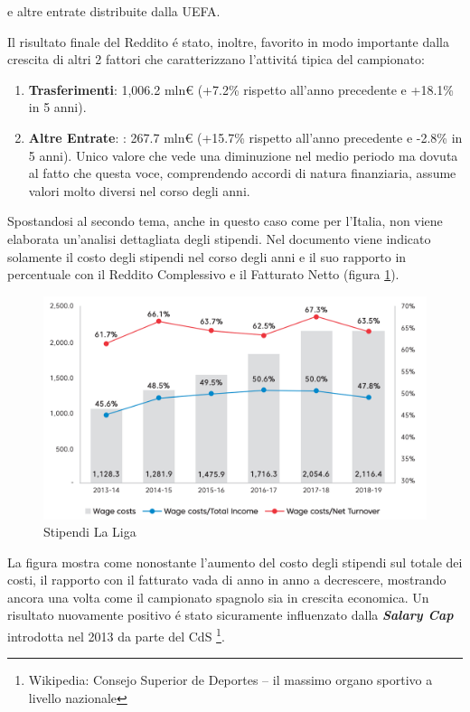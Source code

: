 \documentclass[
    corpo=12pt,
    oneside,
    evenboxes,
    tipotesi=triennale,
    stile=classica,
    oldstyle,
    autoretitolo,
    greek,
]{toptesi}
\begin{document}
\begin{interlinea}{1.5}
\begin{enumerate}
    e altre entrate distribuite dalla UEFA.
\end{enumerate}
Il risultato finale del Reddito \'e stato, inoltre, favorito in modo importante dalla crescita di altri 2 fattori che caratterizzano l'attivit\'a tipica del
campionato:
\begin{enumerate}
    \item \textbf{Trasferimenti}: 1,006.2 mln€ (+7.2\% rispetto all'anno precedente e +18.1\% in 5 anni).
    \item \textbf{Altre Entrate}: : 267.7 mln€ (+15.7\% rispetto all'anno precedente e -2.8\% in 5 anni). Unico valore che vede una diminuzione
    nel medio periodo ma dovuta al fatto che questa voce, comprendendo accordi di natura finanziaria, assume valori molto diversi nel corso degli anni.
\end{enumerate}
Spostandosi al secondo tema, anche in questo caso come per l'Italia, non viene elaborata un'analisi dettagliata degli stipendi. Nel documento
viene indicato solamente il costo degli stipendi nel corso degli anni e il suo rapporto in percentuale con il Reddito Complessivo e il Fatturato Netto
(figura \ref{wage_spain}).
\begin{figure}
    \centering
    \includegraphics[scale=.5]{img/wage_spain.png}
    \caption{Stipendi La Liga}
    \label{wage_spain}
\end{figure}
La figura mostra come nonostante l'aumento del costo degli stipendi sul totale dei costi, il rapporto con il fatturato vada di anno in anno
a decrescere, mostrando ancora una volta come il campionato spagnolo sia in crescita economica. Un risultato nuovamente positivo \'e stato
sicuramente influenzato dalla \emph{\textbf{Salary Cap}} introdotta nel 2013 da parte del CdS \footnote{Wikipedia: Consejo Superior de Deportes – il massimo organo sportivo a livello nazionale}.

\end{interlinea}
\end{document}
